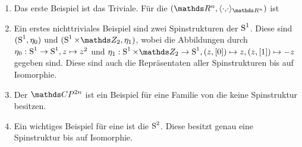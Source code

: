 \begin{Bsp}
	\begin{enumerate}[(1)]
		\item Das erste Beispiel ist das Triviale. Für die \RMF $(\R^n, \scdots_{\R^n})$ ist 
		\item Ein erstes nichttriviales Beispiel sind zwei Spinstrukturen
		der $\operatorname{S}^1$. Diese sind $(\operatorname{S}^1 , \eta_0)$ und $(\Sp^1 \times \Z_2 , \eta_1)$, wobei die Abbildungen durch $\eta_0 : \operatorname{S}^1 \rightarrow \operatorname{S}^1 , z \mapsto z^2$ und $\eta_1 : \Sp^1 \times \Z_2 \rightarrow \Sp^1 , (z,[0]) \mapsto z , (z,[1]) \mapsto -z$ gegeben sind.
		Diese sind auch die Repräsentaten aller Spinstrukturen bis auf 
		Isomorphie. 
		\item Der $\CP^{2n}$ ist ein Beispiel für eine Familie von
		\RMFen die keine Spinstruktur besitzen.
		\item Ein wichtiges Beispiel für eine \RMF ist die $\operatorname{S}^2$. Diese
		besitzt genau eine Spinstruktur bis auf Isomorphie. 
	\end{enumerate}
\end{Bsp}